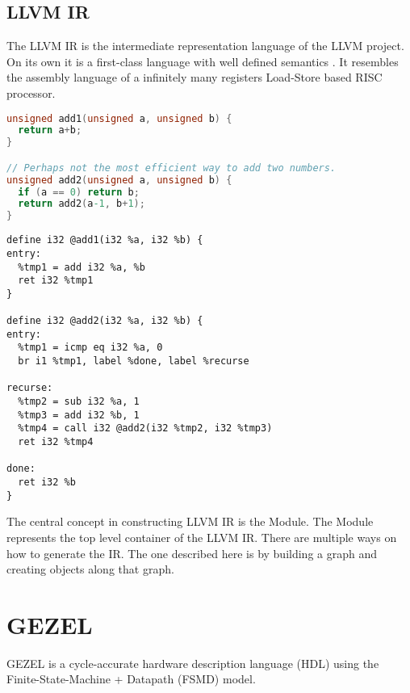 \subsection{LLVM IR}

The LLVM IR is the intermediate representation language of the LLVM
project. On its own it is a first-class language with well defined
semantics \cite{llvm_general}. It resembles the assembly language of a
infinitely many registers Load-Store based RISC processor.

\begin{lstlisting}[language=C]
unsigned add1(unsigned a, unsigned b) {
  return a+b;
}

// Perhaps not the most efficient way to add two numbers.
unsigned add2(unsigned a, unsigned b) {
  if (a == 0) return b;
  return add2(a-1, b+1);
}
\end{lstlisting}

\begin{lstlisting}
define i32 @add1(i32 %a, i32 %b) {
entry:
  %tmp1 = add i32 %a, %b
  ret i32 %tmp1
}

define i32 @add2(i32 %a, i32 %b) {
entry:
  %tmp1 = icmp eq i32 %a, 0
  br i1 %tmp1, label %done, label %recurse

recurse:
  %tmp2 = sub i32 %a, 1
  %tmp3 = add i32 %b, 1
  %tmp4 = call i32 @add2(i32 %tmp2, i32 %tmp3)
  ret i32 %tmp4

done:
  ret i32 %b
}
\end{lstlisting}

\filbreak

The central concept in constructing LLVM IR is the Module. The Module
represents the top level container of the LLVM IR. There are multiple
ways on how to generate the IR. The one described here is by building a
graph and creating objects along that graph.

\section{GEZEL}

GEZEL is a cycle-accurate hardware description language (HDL) using the
Finite-State-Machine + Datapath (FSMD) model.


